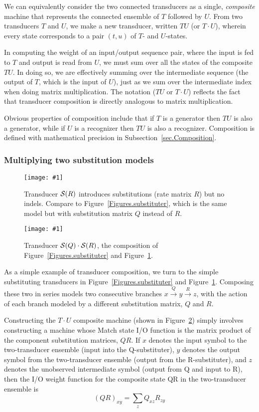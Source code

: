 \documentclass{article}
\newcommand{\secref}[1]{Subsection~\ref{sec.#1}}
\newcommand{\figref}[1]{Figure~\ref{Figures.#1}}
\newcommand{\figlabel}[1]{\label{Figures.#1}}
\newcommand{\easyfig}[4]{
\begin{figure}
\texttt{[image: \#1]}
\caption{ \figlabel{#3} #4}
\end{figure}}
\newcommand{\pdffig}[2]{\easyfig{#1-fig.pdf}{}{#1}{#2}}
\newcommand\substitute{{\cal S}}
\begin{document}
We can equivalently  consider the two connected transducers as
a single, {\em composite} machine that represents
 the connected ensemble of $T$ followed by $U$.  
From two transducers $T$ and $U$,
we make a new transducer, written $TU$ (or $T \cdot U$),
wherein every state corresponds to a pair $(t,u)$ of $T$- and $U$-states.  
 
In computing the weight of an input/output sequence pair, where the input is fed to $T$ and
output is read from $U$, we must sum over all the states of the composite $TU$.  
In doing so, we are effectively summing over the intermediate sequence
(the output of $T$, which is the input of $U$),
just as we sum over the intermediate index when doing matrix multiplication.
The notation ($TU$ or $T \cdot U$) reflects the fact that transducer composition is  directly 
analogous to  matrix multiplication.  

Obvious properties of composition include that
if $T$ is a generator then $TU$ is also a generator, while
if $U$ is a recognizer then $TU$ is also a recognizer.
Composition is defined with mathematical precision in \secref{Composition}. 

\subsubsection{Multiplying two substitution models}

\pdffig{substituter2}{Transducer $\substitute(R)$ introduces substitutions (rate matrix $R$) but no indels. Compare to \figref{substituter}, which is the same model but with substitution matrix $Q$ instead of $R$.}

\pdffig{substituter-substituter2}{Transducer $\substitute(Q) \cdot \substitute(R)$, the composition of \figref{substituter} and \figref{substituter2}.}

As a simple example of transducer composition, we turn to the simple substituting transducers
in \figref{substituter} and \figref{substituter2}.  
Composing these two in series models two consecutive branches 
 $x \stackrel{Q}{\to} y \stackrel{R}{\to} z$, with 
the action of each branch modeled by a different substitution matrix, $Q$ and $R$.  

Constructing the $T \cdot U$ composite machine 
 (shown in \figref{substituter-substituter2})
simply involves constructing a machine whose Match state I/O function
 is the matrix product of the component substitution matrices, $QR$.  
If $x$ denotes the input symbol to the two-transducer ensemble (input into the Q-substituter),
$y$ denotes the output symbol from the two-transducer ensemble (output from the R-substituter),
and $z$ denotes the unobserved intermediate symbol (output from Q and input to R),
then the I/O weight function for the composite state QR in the two-transducer ensemble is
\[
(QR)_{xy} = \sum_z Q_{xz} R_{zy}
\]
\end{document}
